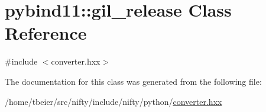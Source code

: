 \hypertarget{classpybind11_1_1gil__release}{}\section{pybind11\+:\+:gil\+\_\+release Class Reference}
\label{classpybind11_1_1gil__release}


{\ttfamily \#include $<$converter.\+hxx$>$}



The documentation for this class was generated from the following file\+:\begin{DoxyCompactItemize}
\item 
/home/tbeier/src/nifty/include/nifty/python/\hyperlink{converter_8hxx}{converter.\+hxx}\end{DoxyCompactItemize}
